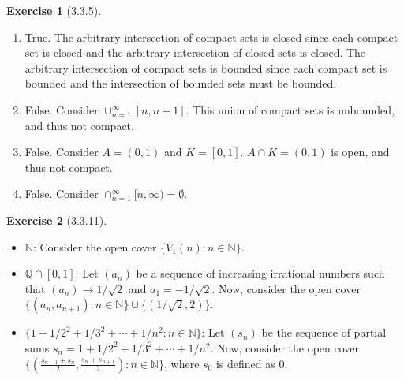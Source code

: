 \documentclass{amsart}
\theoremstyle{definition}
\newtheorem{exercise}{Exercise}
\newcommand{\N}{\mathbb{N}}
\newcommand{\Q}{\mathbb{Q}}
\newcommand{\st}{\mathrel{:}}
\begin{document}
\begin{exercise}[3.3.5]
  \begin{enumerate}[label={(\alph*)}]
    \item True. The arbitrary intersection of compact sets is closed since each
      compact set is closed and the arbitrary intersection of closed sets is
      closed. The arbitrary intersection of compact sets is bounded since each
      compact set is bounded and the intersection of bounded sets must be
      bounded.
    \item False. Consider $\cup_{n=1}^\infty [n, n+1]$. This union of compact
      sets is unbounded, and thus not compact.
    \item False. Consider $A = (0, 1)$ and $K = [0, 1]$. $A \cap K = (0, 1)$ is
      open, and thus not compact.
    \item False. Consider $\cap_{n=1}^\infty \lbrack n, \infty \rparen =
      \emptyset$.
  \end{enumerate}
\end{exercise}

\begin{exercise}[3.3.11]
  \begin{itemize}
    \item $\N$: Consider the open cover $\{V_1(n) \st n \in \N\}$.
    \item $\Q \cap [0, 1]$: Let $(a_n)$ be a sequence of increasing irrational
      numbers such that $(a_n) \to 1 / \sqrt{2}$ and $a_1 = -1 / \sqrt{2}$. Now,
      consider the open cover $\{(a_n, a_{n+1}) \st n \in \N\} \cup \{(1 /
      \sqrt{2}, 2)\}$.
    \item $\{1 + 1/2^2 + 1/3^2 + \cdots + 1/n^2 \st n \in \N\}$: Let $(s_n)$ be
      the sequence of partial sums $s_n = 1 + 1/2^2 + 1/3^2 + \cdots + 1/n^2$.
      Now, consider the open cover $\{(\frac{s_{n-1} + s_{n}}{2}, \frac{s_n +
      s_{n+1}}{2}) \st n \in \N\}$, where $s_0$ is defined as $0$.
  \end{itemize}
\end{exercise}
\end{document}
